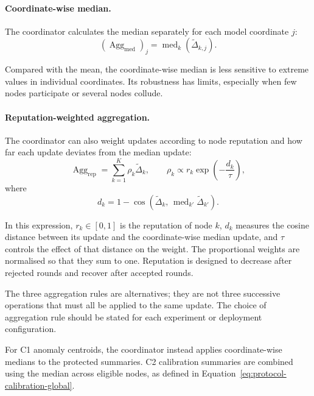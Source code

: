 \documentclass[11pt,a4paper]{article}
\begin{document}
\paragraph{Coordinate-wise median.}

The coordinator calculates the median separately for each model
coordinate $j$:
\begin{equation}
\left(\operatorname{Agg}_{\mathrm{med}}\right)_j
=
\operatorname{med}_{k}
\left(\widetilde{\Delta}_{k,j}\right).
\label{eq:protocol-coordinate-median}
\end{equation}

Compared with the mean, the coordinate-wise median is less sensitive
to extreme values in individual coordinates. Its robustness has
limits, especially when few nodes participate or several nodes
collude.

\paragraph{Reputation-weighted aggregation.}

The coordinator can also weight updates according to node reputation
and how far each update deviates from the median update:
\begin{equation}
\operatorname{Agg}_{\mathrm{rep}}
=
\sum_{k=1}^{K}\rho_k\widetilde{\Delta}_k,
\qquad
\rho_k\propto r_k\exp\!\left(-\frac{d_k}{\tau}\right),
\label{eq:protocol-reputation-aggregation}
\end{equation}
where
\begin{equation}
d_k =
1-\cos\!\left(
\widetilde{\Delta}_k,\,
\operatorname{med}_{k'}
\widetilde{\Delta}_{k'}
\right).
\label{eq:protocol-update-distance}
\end{equation}

In this expression, $r_k\in[0,1]$ is the reputation of node $k$,
$d_k$ measures the cosine distance between its update and the
coordinate-wise median update, and $\tau$ controls the effect of
that distance on the weight. The proportional weights are normalised
so that they sum to one. Reputation is designed to decrease after
rejected rounds and recover after accepted rounds.

The three aggregation rules are alternatives; they are not three
successive operations that must all be applied to the same update.
The choice of aggregation rule should be stated for each experiment
or deployment configuration.

For C1 anomaly centroids, the coordinator instead applies
coordinate-wise medians to the protected summaries. C2 calibration
summaries are combined using the median across eligible nodes, as
defined in Equation~\ref{eq:protocol-calibration-global}.
\end{document}
